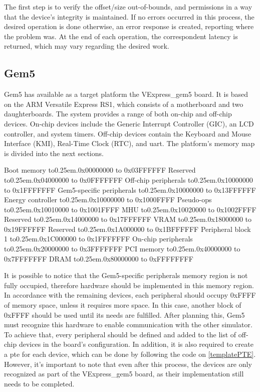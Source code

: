 The first step is to verify the offset/size out-of-bounds, and permissions in a way that the device's integrity is maintained. If no errors occurred 
in this process, the desired operation is done otherwise, an error response is created, reporting where the problem was. 
At the end of each operation, the correspondent latency is returned, which may vary regarding the desired work. 

\subsection{Gem5}

Gem5 has available as a target platform the VExpress\_gem5 board. It is based on the ARM Versatile Express RS1, which 
consists of a motherboard and two daughterboards. The system provides a range of both on-chip and off-chip devices.
On-chip devices include the Generic Interrupt Controller (GIC), an LCD controller, and system timers.
Off-chip devices contain the Keyboard and Mouse Interface (KMI), Real-Time Clock (RTC), and \gls{uart}. 
The platform's memory map is divided into the next sections.

\def\mydots{\xleaders\hbox to0.25em{\hfill.\hfill}\hfill}

\begin{outline}[enumerate]
	\1 Boot memory 						\mydots 	0x00000000 to 0x03FFFFFF
	\1 Reserved							\mydots 	0x04000000 to 0x0FFFFFFF
	\1 Off-chip peripherals				\mydots 	0x10000000 to 0x1FFFFFFF
		\2 Gem5-specific peripherals	\mydots 	0x10000000 to 0x13FFFFFF
			\3 Energy controller 		\mydots 	0x10000000 to 0x1000FFFF
			\3 Pseudo-ops				\mydots		0x10010000 to 0x1001FFFF
			\3 MHU						\mydots		0x10020000 to 0x1002FFFF
		\2 Reserved 					\mydots 	0x14000000 to 0x17FFFFFF
		\2 VRAM							\mydots		0x18000000 to 0x19FFFFFF
		\2 Reserved 					\mydots		0x1A000000 to 0x1BFFFFFF
		\2 Peripheral block 1			\mydots		0x1C000000 to 0x1FFFFFFF
	\1 On-chip  peripherals				\mydots 	0x20000000 to 0x3FFFFFFF
	\1 PCI memory 						\mydots 	0x40000000 to 0x7FFFFFFF
	\1 DRAM								\mydots 	0x80000000 to 0xFFFFFFFF
\end{outline}

It is possible to notice that the Gem5-specific peripherals memory region is not fully occupied, therefore hardware should be implemented 
in this memory region. In accordance with the remaining devices, each peripheral should occupy 0xFFFF of memory space, unless it requires
more space. In this case, another block of 0xFFFF should be used until its needs are fulfilled. After planning this, Gem5 must recognize 
this hardware to enable communication with the other simulator. 
To achieve that, every peripheral should be defined and added to the list of off-chip devices in the 
board's configuration. In addition, it is also required to create a \gls{pte} for each device, which can be done by following the
code on \ref{templatePTE}. However, it's important to note that even after this process, the devices are only recognized as part of the 
VExpress\_gem5 board, as their implementation still needs to be completed.

